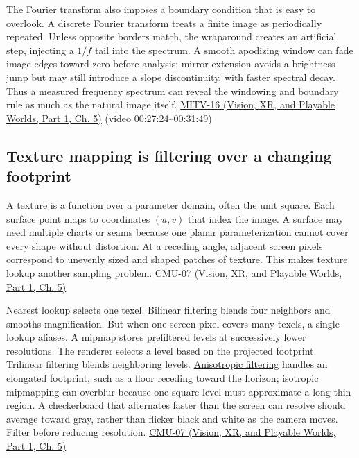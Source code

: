 The Fourier transform also imposes a boundary condition that is easy to overlook. A discrete Fourier transform treats a finite image as periodically repeated. Unless opposite borders match, the wraparound creates an artificial step, injecting a \(1/f\) tail into the spectrum. A smooth apodizing window can fade image edges toward zero before analysis; mirror extension avoids a brightness jump but may still introduce a slope discontinuity, with faster spectral decay. Thus a measured frequency spectrum can reveal the windowing and boundary rule as much as the natural image itself. \href{../07-Vision-XR-and-Playable-Worlds-P01/main.pdf\#nameddest=04-visual-computing-ii-ch036-mitv-16---fast-convolution-low-pass-filter-approximations-integral-images-us-6457032}{MITV-16 (Vision, XR, and Playable Worlds, Part 1, Ch. 5)} (video 00:27:24--00:31:49)

\subsection{Texture mapping is filtering over a changing footprint}\label{03-visual-computing-i-ch004-texture-mapping-is-filtering-over-a-changing-footprint}

\hypertarget{03-visual-computing-i-ch004-texture-mapping-is-filtering-over-a-changing-footprint}{}

A texture is a function over a parameter domain, often the unit square. Each surface point maps to coordinates \((u,v)\) that index the image. A surface may need multiple charts or seams because one planar parameterization cannot cover every shape without distortion. At a receding angle, adjacent screen pixels correspond to unevenly sized and shaped patches of texture. This makes texture lookup another sampling problem. \href{../07-Vision-XR-and-Playable-Worlds-P01/main.pdf\#nameddest=04-visual-computing-ii-ch036-cmu-07---perspective-projection-and-texture-mapping}{CMU-07 (Vision, XR, and Playable Worlds, Part 1, Ch. 5)}

Nearest lookup selects one texel. Bilinear filtering blends four neighbors and smooths magnification. But when one screen pixel covers many texels, a single lookup aliases. A mipmap stores prefiltered levels at successively lower resolutions. The renderer selects a level based on the projected footprint. Trilinear filtering blends neighboring levels. \hyperref[appendix-d5b3c692d9f0]{Anisotropic filtering} handles an elongated footprint, such as a floor receding toward the horizon; isotropic mipmapping can overblur because one square level must approximate a long thin region. A checkerboard that alternates faster than the screen can resolve should average toward gray, rather than flicker black and white as the camera moves. Filter before reducing resolution. \href{../07-Vision-XR-and-Playable-Worlds-P01/main.pdf\#nameddest=04-visual-computing-ii-ch036-cmu-07---perspective-projection-and-texture-mapping}{CMU-07 (Vision, XR, and Playable Worlds, Part 1, Ch. 5)}

